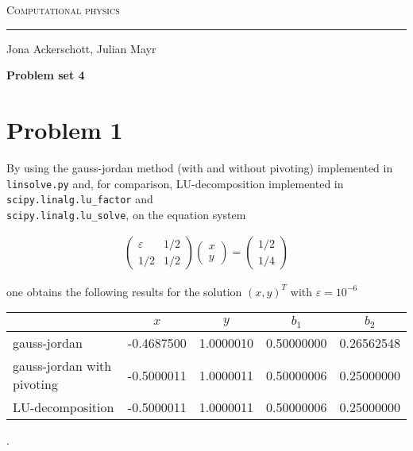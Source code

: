 \documentclass[12pt, a4paper]{article}
\begin{document}
  
  \centerline{\Huge\scshape Computational physics}
  \vspace*{0.5cm}
  \hrule
  \vspace*{0.5cm}
  \centerline{Jona Ackerschott, Julian Mayr}
  \vspace*{1cm}
  \centerline{\Large\bfseries Problem set 4}
  \vspace*{0.5cm}

  \section*{Problem 1}


  By using the gauss-jordan method (with and without pivoting) implemented in {\tt linsolve.py} and, for comparison, LU-decomposition implemented in {\tt scipy.linalg.lu\_factor} and\\ {\tt scipy.linalg.lu\_solve}, on the equation system

  \begin{align}
    \begin{pmatrix} \varepsilon & 1/2 \\ 1/2 & 1/2 \end{pmatrix}
    \begin{pmatrix} x \\ y \end{pmatrix} = 
    \begin{pmatrix} 1/2 \\ 1/4 \end{pmatrix}
    \label{p1_eqsys}
  \end{align}

  \noindent
  one obtains the following results for the solution $(x, y)^T$ with $\varepsilon = 10^{-6}$

  \begin{center}
    \begin{tabular}{l | c | c | c | c}
                                 & $x$        & $y$       & $b_1$       & $b_2$      \\
      \hline
      gauss-jordan               & -0.4687500 & 1.0000010 & 0.50000000  & 0.26562548 \\
      \hline
      gauss-jordan with pivoting & -0.5000011 & 1.0000011 & 0.50000006  & 0.25000000 \\
      \hline
      LU-decomposition           & -0.5000011 & 1.0000011 & 0.50000006  & 0.25000000
    \end{tabular}
  .
  \end{center}
\end{document}

